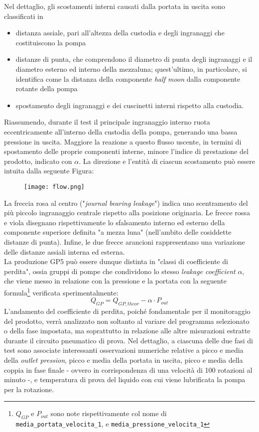 \documentclass[fleqn,10pt]{SelfArx} %
\begin{document}
Nel dettaglio, gli scostamenti interni causati dalla portata in uscita sono classificati in
\begin{itemize}
    \item distanza assiale, pari all'altezza della custodia e degli ingranaggi che costituiscono la pompa
    \item distanze di punta, che comprendono il diametro di punta degli ingranaggi e il diametro esterno ed interno della mezzaluna; quest'ultimo, in particolare, si identifica come la distanza della componente \textit{half moon} dalla componente rotante della pompa
    \item spostamento degli ingranaggi e dei cuscinetti interni rispetto alla custodia.
\end{itemize}
Riassumendo, durante il test il principale ingranaggio interno ruota eccentricamente all'interno della custodia della pompa, generando una bassa pressione in uscita. Maggiore la reazione a questo flusso uscente, in termini di spostamento delle proprie componenti interne, minore l'indice di prestazione del prodotto, indicato con $\alpha$. La direzione e l'entità di ciascun scostamento può essere intuita dalla seguente Figura:
\begin{figure}[H]
    \centering
    \texttt{[image: flow.png]}
    \label{fig:em}
\end{figure}
La freccia rosa al centro ("\textit{journal bearing leakage}") indica uno scentramento del più piccolo ingranaggio centrale rispetto alla posizione originaria. Le frecce rossa e viola disegnano rispettivamente lo sfalsamento interno ed esterno della componente superiore definita "a mezza luna" (nell'ambito delle cosiddette distanze di punta). Infine, le due frecce arancioni rappresentano una variazione delle distanze assiali interna ed esterna.\\
La produzione GP5 può essere dunque distinta in "classi di coefficiente di perdita", ossia gruppi di pompe che condividono lo stesso \textit{leakage coefficient} $\alpha$, che viene messo in relazione con la pressione e la portata con la seguente formula\footnote{$Q_{GP}$ e $P_{out}$ sono note rispettivamente col nome di \texttt{media\_portata\_velocita\_1}, e \texttt{media\_pressione\_velocita\_1}} verificata sperimentalmente:
\begin{equation}
    Q_{GP} = Q_{GP,theor} − \alpha \cdot P_{out}
\end{equation}
L'andamento del coefficiente di perdita, poiché fondamentale per il monitoraggio del prodotto, verrà analizzato non soltanto al variare del programma selezionato o della fase impostata, ma soprattutto in relazione alle altre misurazioni estratte durante il circuito pneumatico di prova. Nel dettaglio, a ciascuna delle due fasi di test sono associate interessanti osservazioni numeriche relative a picco e media della \textit{outlet pression}, picco e media della portata in uscita, picco e media della coppia in fase finale - ovvero in corrispondenza di una velocità di 100 rotazioni al minuto -, e temperatura di prova del liquido con cui viene lubrificata la pompa per la rotazione.
\end{document}

